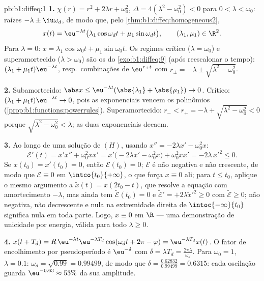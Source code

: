 \begin{solution}{pb:b1:diffeq:1}
\textbf{1.} $\chi(r) = r^2 + 2\lambda r + \omega_0^2$, $\Delta =
4(\lambda^2 - \omega_0^2) < 0$ para $0 < \lambda < \omega_0$: raízes
$-\lambda \pm \iu\omega_d$, de modo que, pelo
\cref{thm:b1:diffeq:homogeneous2},
\[
x(t) = \eu^{-\lambda t}\bigl(\lambda_1\cos\omega_d t +
\mu_1\sin\omega_d t\bigr), \qquad (\lambda_1, \mu_1) \in \R^2 .
\]
Para $\lambda = 0$: $x = \lambda_1\cos\omega_0 t +
\mu_1\sin\omega_0 t$. Os regimes crítico ($\lambda = \omega_0$) e
superamortecido ($\lambda > \omega_0$) são os do
\cref{exo:b1:diffeq:9} (após reescalonar o tempo): $(\lambda_1 +
\mu_1 t)\eu^{-\lambda t}$, resp.\ combinações de $\eu^{r_\pm t}$
com $r_\pm = -\lambda \pm \sqrt{\lambda^2 - \omega_0^2}$.

\textbf{2.} Subamortecido: $\abs x \leq \eu^{-\lambda
t}(\abs{\lambda_1} + \abs{\mu_1}) \to 0$. Crítico: $(\lambda_1 +
\mu_1 t)\eu^{-\lambda t} \to 0$, pois as exponenciais vencem os
polinômios (\cref{prop:b1:functions:powerrules}). Superamortecido:
$r_- < r_+ = -\lambda + \sqrt{\lambda^2 - \omega_0^2} < 0$
porque $\sqrt{\lambda^2 - \omega_0^2} < \lambda$; as duas
exponenciais decaem.

\textbf{3.} Ao longo de uma solução de $(H)$, usando $x'' = -2\lambda x' -
\omega_0^2 x$:
\[
\mathcal E'(t) = x'x'' + \omega_0^2 x x'
= x'\bigl(-2\lambda x' - \omega_0^2 x\bigr) + \omega_0^2 xx'
= -2\lambda\,x'^2 \leq 0 .
\]
Se $x(t_0) = x'(t_0) = 0$, então $\mathcal E(t_0) = 0$; $\mathcal E$
é não negativa e não crescente, de modo que $\mathcal E \equiv 0$ em
$\intco{t_0}{+\infty}$, o que força $x \equiv 0$ ali; para $t \leq
t_0$, aplique o mesmo argumento a $\tilde x(t) = x(2t_0 - t)$, que
resolve a equação com amortecimento $-\lambda$, mas ainda tem
$\tilde{\mathcal E}(t_0) = 0$ e $\tilde{\mathcal E}' =
+2\lambda\tilde x'^2 \geq 0$ com $\tilde{\mathcal E} \geq 0$;
não negativa, não decrescente e nula na extremidade direita de
$\intoc{-\infty}{t_0}$ significa nula em toda parte. Logo, $x \equiv 0$ em
$\R$ --- uma demonstração de unicidade por energia, válida para todo
$\lambda
\geq 0$.

\textbf{4.} $x(t + T_d) = R\,\eu^{-\lambda t}\eu^{-\lambda
T_d}\cos(\omega_d t + 2\pi - \varphi) = \eu^{-\lambda T_d}x(t)$.
O fator de encolhimento por pseudoperíodo é $\eu^{-\delta}$ com
$\delta = \lambda T_d = \frac{2\pi\lambda}{\omega_d}$. Para
$\omega_0 = 1$, $\lambda = 0.1$: $\omega_d = \sqrt{0.99} =
0.99499$, de modo que $\delta = \frac{0.62832}{0.99499} = 0.6315$: cada
oscilação guarda $\eu^{-0.63} \approx 53\%$ da sua amplitude.


\end{solution}
